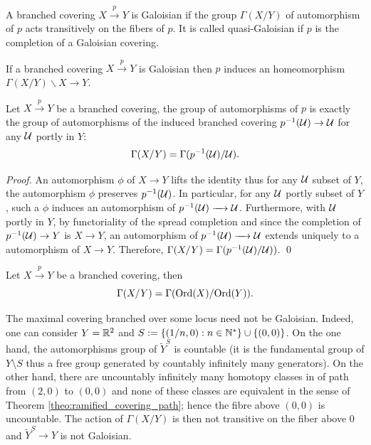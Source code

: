 \begin{defi}\label{def:branched_covering_galoisian_group} A branched covering $X\xrightarrow{p} Y$ is Galoisian if the group $\Gamma(X/Y)$ of automorphism of $p$ acts transitively on the fibers of $p$. It is called quasi-Galoisian if $p$ is the completion of a Galoisian covering.  


\end{defi}

\begin{rem}\label{rem:galois_quotient} If a branched covering $X\xrightarrow{p} Y$ is Galoisian then $p$ induces an homeomorphism $\Gamma(X/Y)\backslash X \rightarrow Y$. 
\end{rem}


\begin{lem}\label{lem:branched_covering_group_automorphisms} Let $X\xrightarrow{p} Y$ be a branched covering, the group of automorphisms of $p$ is exactly the group of automorphisms of the induced branched covering $p^{-1}(\mathcal{U}) \rightarrow \mathcal{U}$ for any $\mathcal{U}$ portly in $Y$:
$$\Gamma(X/Y) = \Gamma(p^{-1}(\mathcal{U})/\mathcal{U}).$$
\end{lem}
\begin{proof}
 An automorphism $\phi$ of $X \rightarrow Y$ lifts the identity thus  for any $\mathcal{U}$ subset  of $Y$, the automorphism $\phi$ preserves $p^{-1}(\mathcal{U})$. In particular, for any $\mathcal{U}$ portly subset of $Y$, such a $\phi$ induces an automorphism of $p^{-1}(\mathcal{U}) \xrightarrow{~~~} \mathcal{U}$. Furthermore, with $\mathcal{U}$ portly in $Y$, by functoriality of the spread completion and since the completion of $p^{-1}(\mathcal{U})\rightarrow Y$ is $X\rightarrow Y$, an automorphism of $p^{-1}(\mathcal{U}) \xrightarrow{~~~} \mathcal{U}$ extends uniquely to a automorphism of $X \xrightarrow{~~~} Y$.   Therefore, $\Gamma(X/Y) = \Gamma(p^{-1}(\mathcal{U})/\mathcal{U}))$.
\qed\end{proof}
\begin{cor}\label{cor:branched_covering}Let $X\xrightarrow{p} Y$ be a branched covering, then
 $$\Gamma(X/Y) =  \Gamma(\mathrm{Ord}(X)/\mathrm{Ord}(Y)).$$
\end{cor}



The maximal covering branched over some locus need not be Galoisian. Indeed, one can consider $Y=\mathbb R^2$ and $S:=\{(1/n,0):n\in \mathbb{N}^*\}\cup \{(0,0)\}$. On the one hand, the automorphisms group of $\widetilde Y^S$ is countable (it is the fundamental group of $Y\setminus S$ thus a free group generated by countably infinitely many generators). On the other hand, there are uncountably infinitely many homotopy classes in of path from $(2,0)$ to $(0,0)$ and none of these classes are equivalent in the sense of Theorem \ref{theo:ramified_covering_path};
hence the fibre above $(0,0)$ is uncountable. The action of $\Gamma(X/Y)$ is then not transitive on the fiber above $0$ and $\widetilde Y^S \rightarrow Y$ is not Galoisian.


